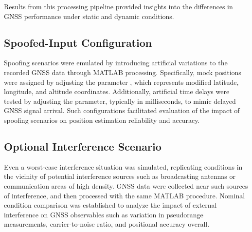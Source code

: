         Results from this processing pipeline provided insights into the differences in GNSS performance under static and dynamic conditions.
    
    \subsection{Spoofed-Input Configuration}

        Spoofing scenarios were emulated by introducing artificial variations to the recorded GNSS data through MATLAB processing. 
        Specifically, mock positions were assigned by adjusting the parameter , which represents modified latitude, longitude, and altitude coordinates. 
        Additionally, artificial time delays were tested by adjusting the  parameter, typically in milliseconds, to mimic delayed GNSS signal arrival. 
        Such configurations facilitated evaluation of the impact of spoofing scenarios on position estimation reliability and accuracy.

    \subsection{Optional Interference Scenario}
    
        Even a worst-case interference situation was simulated, replicating conditions in the vicinity of potential interference sources such as broadcasting antennas or communication areas of high density. 
        GNSS data were collected near such sources of interference, and then processed with the same MATLAB procedure. 
        Nominal condition comparison was established to analyze the impact of external interference on GNSS observables such as variation in pseudorange measurements, carrier-to-noise ratio, and positional accuracy overall.
